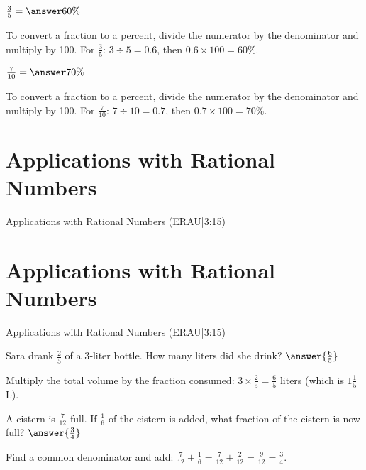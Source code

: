 \documentclass{ximera}
\begin{document}
\begin{problem}
$\frac{3}{5} = \answer{60\%}$

\begin{feedback}
To convert a fraction to a percent, divide the numerator by the denominator and multiply by 100. For $\frac{3}{5}$: $3 \div 5 = 0.6$, then $0.6 \times 100 = 60\%$.
\end{feedback}

\end{problem}

\begin{problem}
$\frac{7}{10} = \answer{70\%}$

\begin{feedback}
To convert a fraction to a percent, divide the numerator by the denominator and multiply by 100. For $\frac{7}{10}$: $7 \div 10 = 0.7$, then $0.7 \times 100 = 70\%$.
\end{feedback}

\end{problem}


\section*{Applications with Rational Numbers} 

Applications with Rational Numbers (ERAU|3:15)



\section*{Applications with Rational Numbers} 

Applications with Rational Numbers (ERAU|3:15)


\begin{problem}
Sara drank \(\frac{2}{5}\) of a 3‑liter bottle. How many liters did she drink? \(\answer{\frac{6}{5}}\)
\begin{feedback}
Multiply the total volume by the fraction consumed: \(3\times\frac{2}{5}=\frac{6}{5}\) liters (which is \(1\frac{1}{5}\) L).
\end{feedback}
\end{problem}

\begin{problem}
A cistern is \(\frac{7}{12}\) full. If \(\frac{1}{6}\) of the cistern is added, what fraction of the cistern is now full? \(\answer{\frac{3}{4}}\)
\begin{feedback}
Find a common denominator and add: \(\frac{7}{12}+\frac{1}{6}=\frac{7}{12}+\frac{2}{12}=\frac{9}{12}=\frac{3}{4}\).
\end{feedback}
\end{problem}
\end{document}
